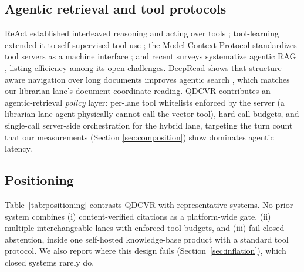 \documentclass[preprint,12pt]{elsarticle}
\begin{document}
\subsection{Agentic retrieval and tool protocols}
ReAct established interleaved reasoning and acting over tools
\cite{react-yao}; tool-learning extended it to self-supervised tool use
\cite{toolformer}; the Model Context Protocol standardizes tool servers as a
machine interface \cite{mcp}; and recent surveys systematize agentic RAG
\cite{singh-agentic-rag}, listing efficiency among its open challenges.
DeepRead shows that structure-aware navigation over
long documents improves agentic search \cite{deepread}, which matches our
librarian lane's document-coordinate reading. QDCVR contributes an
agentic-retrieval \emph{policy} layer: per-lane tool whitelists enforced by
the server (a librarian-lane agent physically cannot call the vector tool),
hard call budgets, and single-call server-side orchestration for the hybrid
lane, targeting the turn count that our measurements (Section
\ref{sec:composition}) show dominates agentic latency.

\subsection{Positioning}
Table~\ref{tab:positioning} contrasts QDCVR with representative systems.
No prior system combines (i) content-verified citations as a platform-wide
gate, (ii) multiple interchangeable lanes with enforced tool budgets, and
(iii) fail-closed abstention, inside one self-hosted knowledge-base product
with a standard tool protocol. We also report where this design fails
(Section~\ref{sec:inflation}), which closed systems rarely do.
\end{document}
